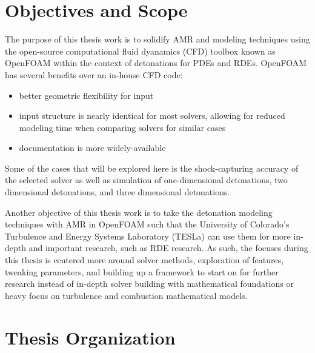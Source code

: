 \section{Objectives and Scope}
The purpose of this thesis work is to solidify AMR and modeling techniques using the open-source computational fluid dyanamics (CFD) toolbox known as OpenFOAM within the context of detonations for PDEs and RDEs. OpenFOAM has several benefits over an in-house CFD code:

\begin{itemize}
    \item better geometric flexibility for input 
    \item input structure is nearly identical for most solvers, allowing for reduced modeling time when comparing solvers for similar cases
    \item documentation is more widely-available
\end{itemize}

\noindent Some of the cases that will be explored here is the shock-capturing accuracy of the selected solver as well as simulation of one-dimensional detonations, two dimensional detonations, and three dimensional detonations.

Another objective of this thesis work is to take the detonation modeling techniques with AMR in OpenFOAM such that the University of Colorado's Turbulence and Energy Systems Laboratory (TESLa) can use them for more in-depth and important research, such as RDE research. As such, the focuses during this thesis is centered more around solver methods, exploration of features, tweaking parameters, and building up a framework to start on for further research instead of in-depth solver building with mathematical foundations or heavy focus on turbulence and combustion mathematical models. 

\section{Thesis Organization}
